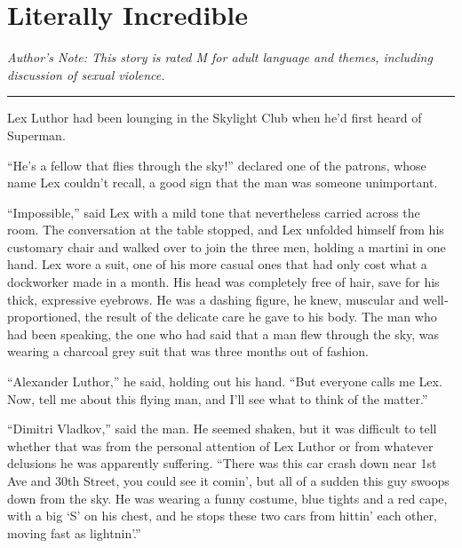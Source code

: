 \documentclass[ebook,12pt]{memoir}
\begin{document}
\mainmatter         %





\hypertarget{literally-incredible}{%
\chapter{Literally Incredible}\label{literally-incredible}}

\emph{Author's Note: This story is rated M for adult language and
themes, including discussion of sexual violence.}

\begin{center}\rule{0.5\linewidth}{0.5pt}\end{center}

Lex Luthor had been lounging in the Skylight Club when he'd first heard
of Superman.

``He's a fellow that flies through the sky!'' declared one of the
patrons, whose name Lex couldn't recall, a good sign that the man was
someone unimportant.

``Impossible,'' said Lex with a mild tone that nevertheless carried
across the room. The conversation at the table stopped, and Lex unfolded
himself from his customary chair and walked over to join the three men,
holding a martini in one hand. Lex wore a suit, one of his more casual
ones that had only cost what a dockworker made in a month. His head was
completely free of hair, save for his thick, expressive eyebrows. He was
a dashing figure, he knew, muscular and well‐proportioned, the result of
the delicate care he gave to his body. The man who had been speaking,
the one who had said that a man flew through the sky, was wearing a
charcoal grey suit that was three months out of fashion.

``Alexander Luthor,'' he said, holding out his hand. ``But everyone
calls me Lex. Now, tell me about this flying man, and I'll see what to
think of the matter.''

``Dimitri Vladkov,'' said the man. He seemed shaken, but it was
difficult to tell whether that was from the personal attention of Lex
Luthor or from whatever delusions he was apparently suffering. ``There
was this car crash down near 1st Ave and 30th Street, you could see it
comin', but all of a sudden this guy swoops down from the sky. He was
wearing a funny costume, blue tights and a red cape, with a big `S' on
his chest, and he stops these two cars from hittin' each other, moving
fast as lightnin'.''
\end{document}
